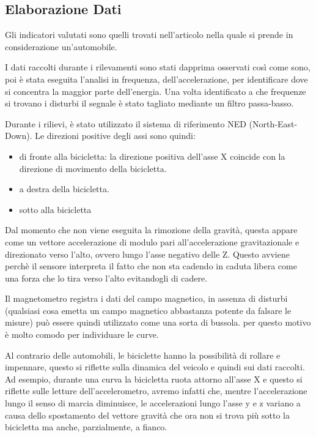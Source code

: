 \documentclass[class=article]{standalone}
\begin{document}
	
	
	\subsection{Elaborazione Dati}
	Gli indicatori valutati sono quelli trovati nell'articolo \cite{chen} nella quale si prende in considerazione un'automobile.
	
	I dati raccolti durante i rilevamenti sono stati dapprima osservati così come sono, poi è stata eseguita l'analisi in frequenza, dell'accelerazione, per identificare dove si concentra la maggior parte dell'energia.
	Una volta identificato a che frequenze si trovano i disturbi il segnale è stato tagliato mediante un filtro passa-basso.
	
	Durante i rilievi, è stato utilizzato il sistema di riferimento NED (North-East-Down). Le direzioni positive degli assi sono quindi:
	\begin{itemize}
		\item di fronte alla bicicletta: la direzione positiva dell'asse X coincide con la direzione di movimento della bicicletta.
		\item a destra della bicicletta.
		\item sotto alla bicicletta
	\end{itemize}
	
	Dal momento che non viene eseguita la rimozione della gravità, questa appare come un vettore accelerazione di modulo pari all'accelerazione gravitazionale e direzionato verso l'alto, ovvero lungo l'asse negativo delle Z. Questo avviene perchè il sensore interpreta il fatto che non sta cadendo in caduta libera come una forza che lo tira verso l'alto evitandogli di cadere.
	
	Il magnetometro registra i dati del campo magnetico, in assenza di disturbi (qualsiasi cosa emetta un campo magnetico abbastanza potente da falsare le misure) può essere quindi utilizzato come una sorta di bussola. per questo motivo è molto comodo per individuare le curve.
	
	\cite{leoni}
	
	Al contrario delle automobili, le biciclette hanno la possibilità di rollare e impennare, questo si riflette sulla dinamica del veicolo e quindi sui dati raccolti.
	Ad esempio, durante una curva la bicicletta ruota attorno all'asse X e questo si riflette sulle letture dell'accelerometro, avremo infatti che, mentre l'accelerazione lungo il senso di marcia diminuisce, le accelerazioni lungo l'asse y e z variano a causa dello spostamento del vettore gravità che ora non si trova più sotto la bicicletta ma anche, parzialmente, a fianco.
	
\end{document}
